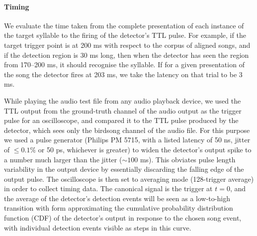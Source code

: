 \documentclass[10pt,letterpaper]{article}
\renewcommand{\subsubsection}[1]{\paragraph{#1}}
\newcommand\argmin{\mathop{\textrm{{\rm argmin}}}\limits}
\newcommand{\noprint}[1]{}
\begin{document}
\noprint{ Since the network will output values $o_t$ between 0 and 1
  at each moment $t$ in an attempt to match the training output, the
  optimal threshold $\tau\in[0,1]$ for the output neuron should be
  computed.  Given the relative cost of false positives vs.~false
  negatives $C$, and the acceptable time difference between target
  syllable and correct output $\Delta t_d$, we compute the optimal
  threshold for an output element according to the definitions above:
\begin{eqnarray*}
  \textrm{true positives}_\tau &=& \textrm{size of set}_{s\in \textrm{target songs}} o_t > \tau, \left| t \leq \Delta t_d \right| \\
  \textrm{false negatives}_\tau &=& \textrm{size of set} {s\in\textrm{target songs}} - \textrm{size of set} \textrm{true positives} \\
  \textrm{false positives}_\tau &=& \textrm{size of set}_{s\in \textrm{target songs}} o_t > \tau, \left| t > \Delta t_d \right| \\
  \widehat{\tau} &=& \argmin_\tau C\textrm{false positive} + \textrm{false negatives}
\end{eqnarray*}
}

\subsubsection{Timing}


We evaluate the time taken from the complete presentation of each
instance of the target syllable to the firing of the detector's TTL
pulse.  For example, if the target trigger point is at 200 ms with
respect to the corpus of aligned songs, and if the detection region is
30 ms long, then when the detector has seen the region from 170--200
ms, it should recognise the syllable.  If for a given presentation of
the song the detector fires at 203 ms, we take the latency on that
trial to be 3 ms.

While playing the audio test file from any audio playback device, we
used the TTL output from the ground-truth channel of the audio output
as the trigger pulse for an oscilloscope, and compared it to the TTL
pulse produced by the detector, which sees only the birdsong channel
of the audio file. For this purpose we used a pulse generator (Philips
PM 5715, with a listed latency of 50 ns, jitter of $\leq 0.1\%$ or 50
ps, whichever is greater) to widen the detector's output spike to a
number much larger than the jitter ($\sim 100$ ms).  This obviates
pulse length variability in the output device by essentially
discarding the falling edge of the output pulse.  The oscilloscope is
then set to averaging mode (128-trigger average) in order to collect
timing data. The canonical signal is the trigger at $t=0$, and the
average of the detector's detection events will be seen as a
low-to-high transition with form approximating the cumulative
probability distribution function (CDF) of the detector's output in
response to the chosen song event, with individual detection events
visible as steps in this curve.
\end{document}
